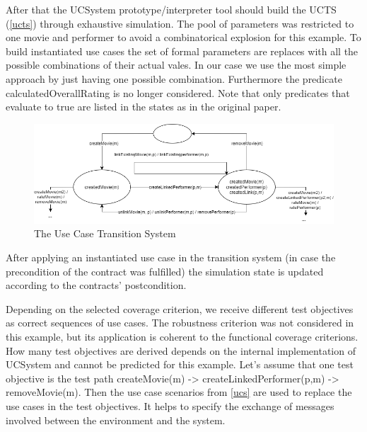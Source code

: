 After that the UCSystem prototype/interpreter tool should build the UCTS (\autoref{ucts}) through exhaustive simulation. The pool of parameters was restricted to one movie and performer to avoid a combinatorical explosion for this example. To build instantiated use cases the set of formal parameters are replaces with all the possible combinations of their actual vales. In our case we use the most simple approach by just having one possible combination. Furthermore the predicate calculatedOverallRating is no longer considered. Note that only predicates that evaluate to true are listed in the states as in the original paper. 

\begin{figure}[h]
	\centering
	\includegraphics[width=1.0\textwidth]{img/ucts.png}
	\caption{The Use Case Transition System}
	\label{ucts}
\end{figure}

After applying an instantiated use case in the transition system (in case the precondition of the contract was fulfilled) the simulation state is updated according to the contracts' postcondition. 

Depending on the selected coverage criterion, we receive different test objectives as correct sequences of use cases. The robustness criterion was not considered in this example, but its application is coherent to the functional coverage criterions. How many test objectives are derived depends on the internal implementation of UCSystem and cannot be predicted for this example. Let's assume that one test objective is the test path createMovie(m) -> createLinkedPerformer(p,m) -> removeMovie(m). Then the use case scenarios from \autoref{ucs} are used to replace the use cases in the test objectives. It helps to specify the exchange of messages involved between the environment and the system.

\newpage

